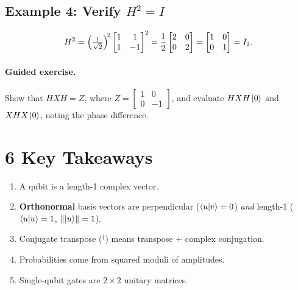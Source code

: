 \documentclass[12pt]{article}
\begin{document}
\subsection*{Example 4: Verify \(H^{2}=I\)}
\[
  H^{2}
  =
  \Bigl(\tfrac1{\sqrt2}\Bigr)^{\!2}
  \begin{bmatrix}1&1\\1&-1\end{bmatrix}^{2}
  =
  \frac12
  \begin{bmatrix}
     2 & 0\\
     0 & 2
  \end{bmatrix}
  =
  \begin{bmatrix}1&0\\0&1\end{bmatrix}=I_{2}.
\]

\paragraph{Guided exercise.}
Show that \(HXH=Z\), where
\(Z=\begin{bmatrix}1&0\\0&-1\end{bmatrix}\), and evaluate
\(HXH\ket{0}\) and \(XHX\ket{0}\),
noting the phase difference.

\section*{6 \quad Key Takeaways}

\begin{enumerate}
  \item A qubit is a length-1 complex vector.
  \item \textbf{Orthonormal} basis vectors are perpendicular
        (\(\braket{u}{v}=0\)) \emph{and} length-1
        (\(\braket{u}{u}=1\), \(\norm{\ket{u}}=1\)).
  \item Conjugate transpose (\(^{\dagger}\)) means transpose + complex
        conjugation.
  \item Probabilities come from squared moduli of amplitudes.
  \item Single-qubit gates are \(2\times2\) unitary matrices.
\end{enumerate}
\end{document}
